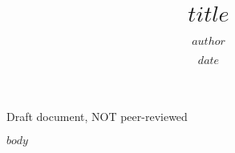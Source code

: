 \documentclass[$fontsize$]{article}
\author{$author$}
\title{$title$}
\date{$date$}
\begin{document}
\maketitle

\thispagestyle{empty}
\doclicenseThis
\LARGE{Draft document, NOT peer-reviewed}\normalsize
\tableofcontents
\setcounter{page}{0}
\clearpage

$body$

\end{document}
